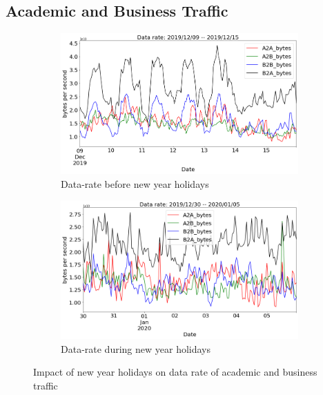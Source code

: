 \documentclass[10pt, journal, letterpaper]{IEEEtran}
\newcommand\linearFigSze{0.48}
\begin{document}
\subsection{Academic and Business Traffic}
\begin{figure}
    \begin{subfigure}{\linearFigSze\textwidth}
          \centering
          \includegraphics[width=\columnwidth]{img/BCH2_acaBus_bps.png}
          \caption{Data-rate before new year holidays}
          \label{fig:BCH2_acaBus_bps}
    \end{subfigure}
    \begin{subfigure}{\linearFigSze\textwidth}
          \centering
          \includegraphics[width=\columnwidth]{img/CH2_acaBus_bps.png}
          \caption{Data-rate during new year holidays}
          \label{fig:CH2_acaBus_bps}
    \end{subfigure}
    \caption{Impact of new year holidays on data rate of academic and business traffic}
    \label{fig:datarate_acaBus_BCH_CH}
\end{figure}
\end{document}
